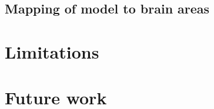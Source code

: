 \subsection{Mapping of model to brain areas}





\section{Limitations}


\section{Future work}









